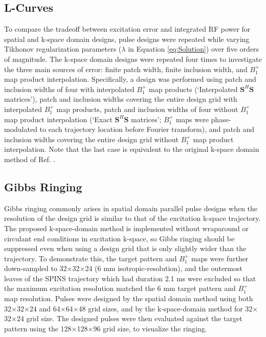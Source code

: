 \subsection*{L-Curves}
To compare the tradeoff between excitation error and integrated RF power for spatial and k-space domain designs,
pulse designs were repeated while varying Tikhonov regularization parameters ($\lambda$ in Equation \ref{eq:Solution}) 
over five orders of magnitude. 
The k-space domain designs were repeated four times to investigate the three main sources of error:
finite patch width, finite inclusion width, and $B_1^+$ map product interpolation. 
Specifically, a design was performed using patch and inclusion widths of four
with interpolated $B_1^+$ map products (`Interpolated $\bm{S}^H\bm{S}$ matrices'),
patch and inclusion widths covering the entire design grid with interpolated $B_1^+$ map products,
patch and inclusion widths of four without $B_1^+$ map product interpolation (`Exact $\bm{S}^H\bm{S}$ matrices'; 
$B_1^+$ maps were phase-modulated to each trajectory location before Fourier transform),
and patch and inclusion widths covering the entire design grid without $B_1^+$ map product interpolation. 
Note that the last case is equivalent to the original k-space domain method of Ref. \cite{Katscher:2003:Magn-Reson-Med:12509830}.

\subsection*{Gibbs Ringing}
Gibbs ringing commonly arises in spatial domain parallel pulse designs when the resolution of the 
design grid is similar to that of the excitation k-space trajectory. 
The proposed k-space-domain method is implemented without wraparound or circulant end conditions in excitation k-space, 
so Gibbs ringing should be suppressed even when using a design grid that is only slightly wider than the trajectory. 
To demonstrate this, 
the target pattern and $B_1^+$ maps were further down-sampled to 32$\times$32$\times$24 (6 mm isotropic-resolution),
and the outermost leaves of the SPINS trajectory which had duration 2.1 ms were excluded so that the maximum excitation 
resolution matched the 6 mm target pattern and $B_1^+$ map resolution. 
Pulses were designed by the spatial domain method using both 32$\times$32$\times$24 and 64$\times$64$\times$48 grid sizes,
and by the k-space-domain method for 32$\times$32$\times$24 grid size.
The designed pulses were then evaluated against the target pattern using the 128$\times$128$\times$96 grid size,
to visualize the ringing.

